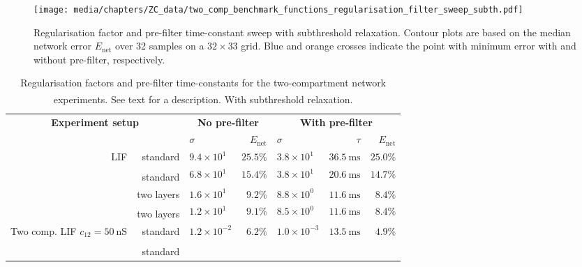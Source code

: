 \begin{figure}[p]
	\texttt{[image: media/chapters/ZC\_data/two\_comp\_benchmark\_functions\_regularisation\_filter\_sweep\_subth.pdf]}
	\caption[Regularisation factor and pre-filter time-constant sweep with subthreshold relaxation]{Regularisation factor and pre-filter time-constant sweep with subthreshold relaxation. Contour plots are based on the median network error $E_\mathrm{net}$ over 32 samples on a $32 \times 33$ grid. Blue and orange crosses indicate the point with minimum error with and without pre-filter, respectively.}
	\label{fig:regularization_parameter_sweep_subth}
\end{figure}

\begin{table}
	\caption[Regularisation factors and pre-filter time-constants.]{Regularisation factors and pre-filter time-constants for the two-compartment \LIF network experiments. See text for a description.
	\textsuperscript{\dag}With subthreshold relaxation.
	}
	\label{tbl:regularization_paremteters}
	\centering
	\small
	\setlength{\tabcolsep}{10.75pt}
	\sffamily
	\begin{tabular}{r r l r l r r}
		\toprule
		\multicolumn{2}{c}{\textbf{Experiment setup}} &
		\multicolumn{2}{c}{\textbf{No pre-filter}} &
		\multicolumn{3}{c}{\textbf{With pre-filter}} \\
		\cmidrule{1-2}\cmidrule(l){3-4}\cmidrule(l){5-7}
		& & $\sigma$ & $E_\mathrm{net}$ & $\sigma$ & $\tau$ & $E_\mathrm{net}$ \\
		\midrule
		\multirow{4}{2.7cm}[-0.5em]{\raggedleft LIF}
			& standard
			& $9.4 \times 10^{1}$ & $25.5\%$
			& $3.8 \times 10^{1}$ & $\SI{36.5}{\milli\second}$ & $25.0\%$ \\
			& standard\textsuperscript{\dag}
			& $6.8 \times 10^{1}$ & $15.4\%$
			& $3.8 \times 10^{1}$ & $\SI{20.6}{\milli\second}$ & $14.7\%$ \\
		\cmidrule{2-7}
			& two layers
			& $1.6 \times 10^{1}$ & $9.2\%$
			& $8.8 \times 10^{0}$ & $\SI{11.6}{\milli\second}$ & $8.4\%$ \\
			& two layers\textsuperscript{\dag}
			& $1.2 \times 10^{1}$ & $9.1\%$
			& $8.5 \times 10^{0}$ & $\SI{11.6}{\milli\second}$ & $8.4\%$ \\
		\midrule
		\multirow{4}{2.7cm}[-0.5em]{\raggedleft Two comp. LIF $c_{12} = \SI{50}{\nano\siemens}$}
			& standard
			& $1.2 \times 10^{-2}$ & $6.2\%$
			& $1.0 \times 10^{-3}$ & $\SI{13.5}{\milli\second}$ & $4.9\%$ \\
			& standard\textsuperscript{\dag}

\end{tabular}
\end{table}

